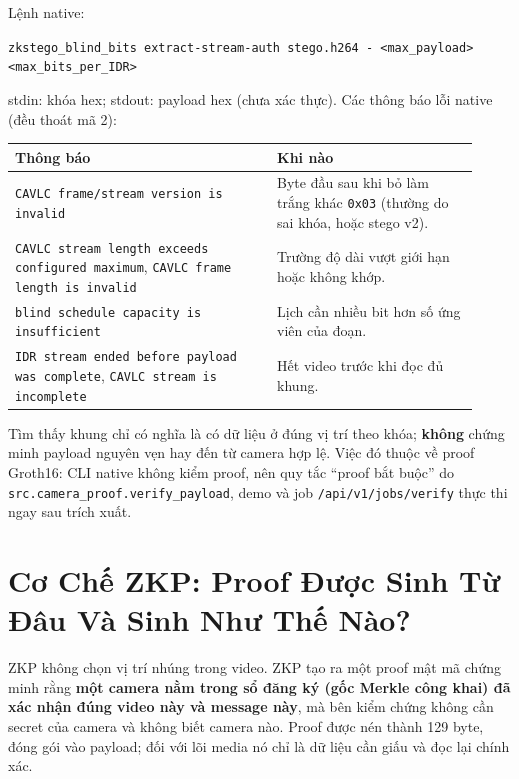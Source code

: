 \documentclass[11pt,a4paper]{article}
\begin{document}
Lệnh native:

\begin{center}
\footnotesize
\texttt{zkstego\_blind\_bits extract-stream-auth stego.h264 - <max\_payload> <max\_bits\_per\_IDR>}
\end{center}

stdin: khóa hex; stdout: payload hex (chưa xác thực). Các thông báo lỗi native (đều
thoát mã 2):

\begin{center}
\small
\begin{tabular}{p{0.52\linewidth}p{0.40\linewidth}}
\toprule
Thông báo & Khi nào \\
\midrule
\texttt{CAVLC frame/stream version is invalid} & Byte đầu sau khi bỏ làm trắng khác \texttt{0x03} (thường do sai khóa, hoặc stego v2). \\
\texttt{CAVLC stream length exceeds configured maximum}, \texttt{CAVLC frame length is invalid} & Trường độ dài vượt giới hạn hoặc không khớp. \\
\texttt{blind schedule capacity is insufficient} & Lịch cần nhiều bit hơn số ứng viên của đoạn. \\
\texttt{IDR stream ended before payload was complete}, \texttt{CAVLC stream is incomplete} & Hết video trước khi đọc đủ khung. \\
\bottomrule
\end{tabular}
\end{center}

Tìm thấy khung chỉ có nghĩa là có dữ liệu ở đúng vị trí theo khóa; \textbf{không}
chứng minh payload nguyên vẹn hay đến từ camera hợp lệ. Việc đó thuộc về proof
Groth16: CLI native không kiểm proof, nên quy tắc ``proof bắt buộc'' do
\texttt{src.camera\_proof.verify\_payload}, demo và job \texttt{/api/v1/jobs/verify}
thực thi ngay sau trích xuất.

\section{Cơ Chế ZKP: Proof Được Sinh Từ Đâu Và Sinh Như Thế Nào?}
\label{sec:zkp}

ZKP không chọn vị trí nhúng trong video. ZKP tạo ra một proof mật mã chứng minh rằng
\textbf{một camera nằm trong sổ đăng ký (gốc Merkle công khai) đã xác nhận đúng video
này và message này}, mà bên kiểm chứng không cần secret của camera và không biết
camera nào. Proof được nén thành 129 byte, đóng gói vào payload; đối với lõi media nó
chỉ là dữ liệu cần giấu và đọc lại chính xác.
\end{document}
